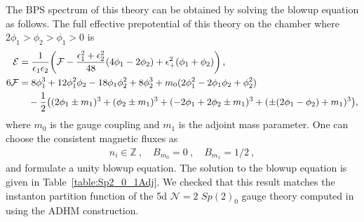 The BPS spectrum of this theory can be obtained by solving the blowup equation as follows. The full effective prepotential of this theory on the chamber where $2\phi_1>\phi_2>\phi_1>0$ is
\begin{align}\label{eq:Sp2_0_adj_F}
\mathcal{E} & = \frac{1}{\epsilon_1 \epsilon_2} \qty(\mathcal{F} - \frac{\epsilon_1^2 + \epsilon_2^2}{48} \qty(4\phi_1 - 2\phi_2) + \epsilon_+^2 (\phi_1 + \phi_2) ) \,, \nonumber \\
6\mathcal{F}
&= 8\phi_1^3 + 12\phi_1^2 \phi_2 - 18\phi_1 \phi_2^2 + 8\phi_2^3 + m_0 (2\phi_1^2 - 2\phi_1 \phi_2 + \phi_2^2) \\
& \quad -\frac{1}{2} \qty((2\phi_1 \pm m_1)^3 + (\phi_2 \pm m_1)^3 + (-2\phi_1 + 2\phi_2 \pm m_1)^3 + (\pm(2\phi_1 - \phi_2) + m_1)^3), \nonumber
\end{align}
where $ m_0 $ is the gauge coupling and $ m_1 $ is the adjoint mass parameter. One can choose the consistent magnetic fluxes as
\begin{align} \label{eq:Sp2_0_adj_shift}
n_i \in \mathbb{Z} \ , \quad
B_{m_0} = 0 \ , \quad
B_{m_1} = 1/2 \ ,
\end{align}
and formulate a unity blowup equation. The solution to the blowup equation is given in Table~\ref{table:Sp2_0_1Adj}. We checked that this result matches the instanton partition function of the 5d $\mathcal{N}=2$ $Sp(2)_0$ gauge theory computed in \cite{Nekrasov:2004vw,Shadchin:2004yx} using the ADHM construction.

